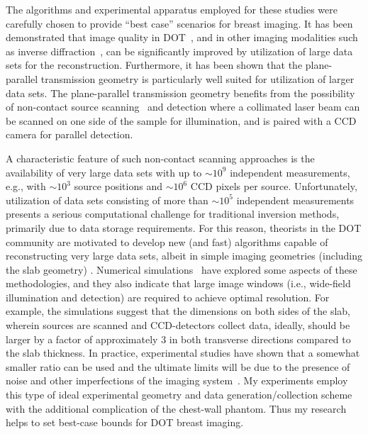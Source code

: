 The algorithms and experimental apparatus employed for these studies were carefully chosen to provide “best case” scenarios for breast imaging. It has been demonstrated that image quality in DOT~\cite{Wang2005,Konecky2008a,Bonfert-Taylor2012}, and in other imaging modalities such as inverse diffraction~\cite{Chaillat2012}, can be significantly improved by utilization of large data sets for the reconstruction. Furthermore, it has been shown that the plane-parallel transmission geometry is particularly well suited for utilization of larger data sets. The plane-parallel transmission geometry benefits from the possibility of non-contact source scanning~\cite{Schulz2003,Ripoll2003,Ripoll2004,Turner2005,Wang2005} and detection where a collimated laser beam can be scanned on one side of the sample for illumination, and is paired with a CCD camera for parallel detection.

A characteristic feature of such non-contact scanning approaches is the availability of very large data sets with up to $\sim 10^9$ independent measurements, e.g., with $\sim 10^3$ source positions and $\sim 10^6$ CCD pixels per source. Unfortunately, utilization of data sets consisting of more than $\sim 10^5$ independent measurements presents a serious computational challenge for traditional inversion methods, primarily due to data storage requirements. For this reason, theorists in the DOT community are motivated to develop new (and fast) algorithms capable of reconstructing very large data sets, albeit in simple imaging geometries (including the slab geometry) \cite{Markel2001,Markel2002,Markel2003,Markel2003a,Markel2004}. Numerical simulations~\cite{Markel2002} have explored some aspects of these methodologies, and they also indicate that large image windows (i.e., wide-field illumination and detection) are required to achieve optimal resolution. For example, the simulations suggest that the dimensions on both sides of the slab, wherein sources are scanned and CCD-detectors collect data, ideally, should be larger by a factor of approximately $3$ in both transverse directions compared to the slab thickness.  In practice, experimental studies have shown that a somewhat smaller ratio can be used and the ultimate limits will be due to the presence of noise and other imperfections of the imaging system~\cite{Wang2005,Konecky2008a}. My experiments employ this type of ideal experimental geometry and data generation/collection scheme with the additional complication of the chest-wall phantom. Thus my research helps to set best-case bounds for DOT breast imaging.

